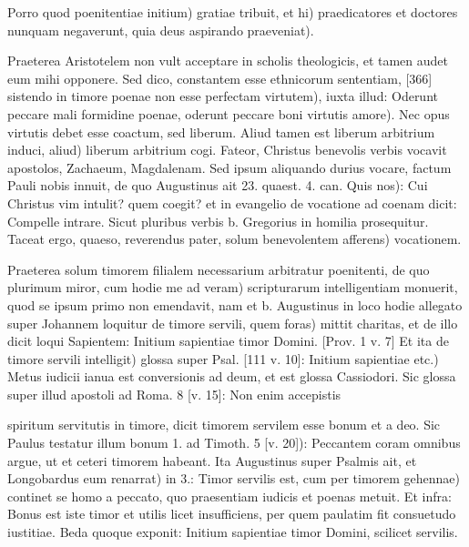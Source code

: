 Porro quod poenitentiae initium) gratiae tribuit, et hi) praedicatores et doctores nunquam negaverunt, quia deus aspirando praeveniat).

Praeterea Aristotelem non vult acceptare in scholis theologicis, et tamen audet eum mihi opponere. Sed dico, constantem esse ethnicorum sententiam, [366] sistendo in timore poenae non esse perfectam virtutem), iuxta illud: Oderunt peccare mali formidine poenae, oderunt peccare boni virtutis amore). Nec opus virtutis debet esse coactum, sed liberum. Aliud tamen est liberum arbitrium induci, aliud) liberum arbitrium cogi. Fateor, Christus benevolis verbis vocavit apostolos, Zachaeum, Magdalenam. Sed ipsum aliquando durius vocare, factum Pauli nobis innuit, de quo Augustinus ait 23. quaest. 4. can. Quis nos): Cui Christus vim intulit? quem coegit? et in evangelio de vocatione ad coenam dicit: Compelle intrare. Sicut pluribus verbis b. Gregorius in homilia prosequitur. Taceat ergo, quaeso, reverendus pater, solum benevolentem afferens) vocationem.

Praeterea solum timorem filialem necessarium arbitratur poenitenti, de quo plurimum miror, cum hodie me ad veram) scripturarum intelligentiam monuerit, quod se ipsum primo non emendavit, nam et b. Augustinus in loco hodie allegato super Johannem loquitur de timore servili, quem foras) mittit charitas, et de illo dicit loqui Sapientem: Initium sapientiae timor Domini. [Prov. 1 v. 7] Et ita de timore servili intelligit) glossa super Psal. [111 v. 10]: Initium sapientiae etc.) Metus iudicii ianua est conversionis ad deum, et est glossa Cassiodori. Sic glossa super illud apostoli ad Roma. 8 [v. 15]: Non enim accepistis

spiritum servitutis in timore, dicit timorem servilem esse bonum et a deo. Sic Paulus testatur illum bonum 1. ad Timoth. 5 [v. 20]): Peccantem coram omnibus argue, ut et ceteri timorem habeant. Ita Augustinus super Psalmis ait, et Longobardus eum renarrat) in 3.: Timor servilis est, cum per timorem gehennae) continet se homo a peccato, quo praesentiam iudicis et poenas metuit. Et infra: Bonus est iste timor et utilis licet insufficiens, per quem paulatim fit consuetudo iustitiae. Beda quoque exponit: Initium sapientiae timor Domini, scilicet servilis.

